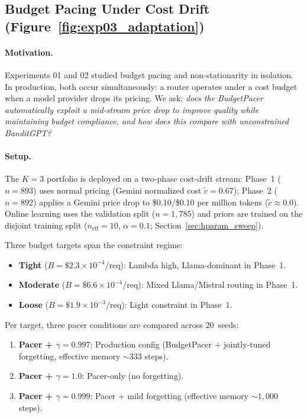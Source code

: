 
\subsection{Budget Pacing Under Cost Drift (Figure~\ref{fig:exp03_adaptation})}
\label{sec:budget_drift}

\paragraph{Motivation.}
Experiments 01 and 02 studied budget pacing and non-stationarity in
isolation.  In production, both occur simultaneously: a router
operates under a cost budget when a model provider drops its pricing.
We ask: \emph{does the BudgetPacer automatically exploit a mid-stream
price drop to improve quality while maintaining budget compliance,
and how does this compare with unconstrained BanditGPT?}

\paragraph{Setup.}
The $K{=}3$ portfolio is deployed on a two-phase cost-drift stream:
Phase~1 ($n{=}893$) uses normal pricing (Gemini normalized cost
$\tilde{c}{=}0.67$); Phase~2 ($n{=}892$) applies a Gemini price
drop to \$0.10/\$0.10 per million tokens ($\tilde{c} \approx 0.0$).
Online learning uses the validation split ($n{=}1{,}785$) and
priors are trained on the disjoint training split
($n_{\mathrm{eff}}{=}10$, $\alpha{=}0.1$;
Section~\ref{sec:hparam_sweep}).

Three budget targets span the constraint regime:
\begin{itemize}[nosep,leftmargin=*]
  \item \textbf{Tight} ($B{=}\$2.3{\times}10^{-4}$/req):
    Lambda high, Llama-dominant in Phase~1.
  \item \textbf{Moderate} ($B{=}\$6.6{\times}10^{-4}$/req):
    Mixed Llama/Mistral routing in Phase~1.
  \item \textbf{Loose} ($B{=}\$1.9{\times}10^{-3}$/req):
    Light constraint in Phase~1.
\end{itemize}

\noindent
Per target, three pacer conditions are compared across 20~seeds:
\begin{enumerate}[nosep,leftmargin=*]
  \item \textbf{Pacer + $\gamma{=}0.997$}: Production config
    (BudgetPacer + jointly-tuned forgetting,
    effective memory ${\sim}333$ steps).
  \item \textbf{Pacer + $\gamma{=}1.0$}: Pacer-only (no forgetting).
  \item \textbf{Pacer + $\gamma{=}0.999$}: Pacer + mild forgetting
    (effective memory ${\sim}1{,}000$ steps).
\end{enumerate}

